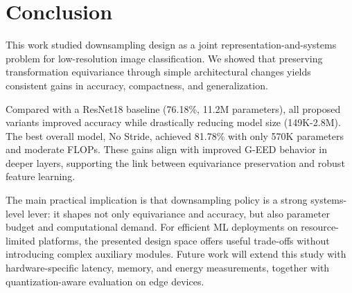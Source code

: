 \documentclass[conference]{IEEEtran}
\begin{document}
\section{Conclusion}\label{sec:conclusion}

This work studied downsampling design as a joint representation-and-systems problem for low-resolution image classification. We showed that preserving transformation equivariance through simple architectural changes yields consistent gains in accuracy, compactness, and generalization.

Compared with a ResNet18 baseline (76.18\%, 11.2M parameters), all proposed variants improved accuracy while drastically reducing model size (149K-2.8M). The best overall model, No Stride, achieved 81.78\% with only 570K parameters and moderate FLOPs. These gains align with improved G-EED behavior in deeper layers, supporting the link between equivariance preservation and robust feature learning.

The main practical implication is that downsampling policy is a strong systems-level lever: it shapes not only equivariance and accuracy, but also parameter budget and computational demand. For efficient ML deployments on resource-limited platforms, the presented design space offers useful trade-offs without introducing complex auxiliary modules. Future work will extend this study with hardware-specific latency, memory, and energy measurements, together with quantization-aware evaluation on edge devices.
\end{document}
